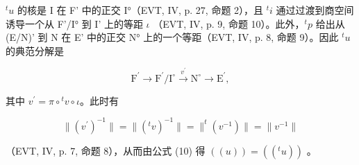 \(^{t}u\) 的核是 I 在 F' 中的正交 I°（EVT, IV, p. 27, 命题 2），且 \(^{t}i\) 通过过渡到商空间诱导一个从 F'/I° 到 I' 上的等距 \(\iota\) （EVT, IV, p. 9, 命题 10）。此外，\(^{t}p\) 给出从 (E/N)' 到 N 在 E' 中的正交 N° 上的一个等距（EVT, IV, p. 8, 命题 9）。因此 \(^{t}u\) 的典范分解是

\[
\mathrm{F} ^ {\prime} \longrightarrow \mathrm{F} ^ {\prime} / \mathrm{I} ^ {\circ} \stackrel {v ^ {\prime}} {\longrightarrow} \mathrm{N} ^ {\circ} \longrightarrow \mathrm{E} ^ {\prime},
\]

其中 \(v^{\prime} = \pi \circ{}^{t}v\circ \iota\)。此时有

\[
\| (v ^ {\prime}) ^ {- 1} \| = \| (^ {t} v) ^ {- 1} \| = \| ^ {t} (v ^ {- 1}) \| = \| v ^ {- 1} \|
\]

（EVT, IV, p. 7, 命题 8），从而由公式 (10) 得 \(((u)) = ((^t u))\) 。


